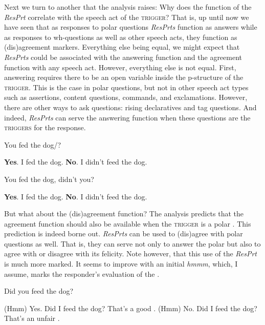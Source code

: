 \documentclass[output=paper]{LSP/langsci}
\begin{document}
Next we turn to another  that the analysis raises: Why does the function of the \textit{ResPrt} correlate with the speech act of the \textsc{trigger}? That is, up until now we have seen that as responses to polar questions \textit{ResPrts} function as answers while as responses to wh-questions as well as other speech acts, they function as (dis)agreement markers. Everything else being equal, we might expect that \textit{ResPrts} could be associated with the answering function and the agreement function with any speech act. However, everything else is not equal. First, answering requires there to be an open variable inside the p-structure of the \textsc{trigger.} This is the case in polar questions, but not in other speech act types such as assertions, content questions, commands, and exclamations. However, there are other ways to ask questions: rising declaratives and tag questions. And indeed, \textit{ResPrts} can serve the answering function when these questions are the \textsc{triggers} for the response.


\ea\label{ex:wiltschko:62}
\begin{xlist}
  You fed the dog/?
\begin{xlisti}
 \ex \textbf{Yes}. I fed the dog.
 \ex \textbf{No}. I didn’t feed the dog.
\end{xlisti}
\end{xlist}
\z


\ea\label{ex:wiltschko:63}
\begin{xlist}
    You fed the dog, didn’t you? 
   \begin{xlisti}
    \ex   \textbf{Yes}. I fed the dog.
    \ex   \textbf{No}. I didn’t feed the dog.
\end{xlisti}    
\end{xlist}
\z

But what about the (dis)agreement function? The analysis predicts that the agreement function should also be available when the \textsc{trigger} is a polar . This prediction is indeed borne out. \textit{ResPrts} can be used to (dis)agree with polar questions as well. That is, they can serve not only to answer the polar  but also to agree with or disagree with its felicity. Note however, that this use of the \textit{ResPrt} is much more marked.
It seems to improve with an initial \textit{hmmm}, which, I assume, marks the responder’s evaluation of the . 


\ea\label{ex:wiltschko:64}
\begin{xlist}
   Did you feed the dog?
    \begin{xlisti}
    \ex (Hmm) Yes. Did I feed the dog? That’s a good .
    \ex (Hmm) No.  Did I feed the dog? That’s an unfair .
    \end{xlisti}
\end{xlist}
\z
\end{document}
